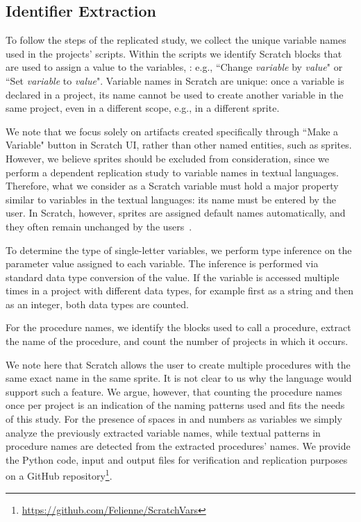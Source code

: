 \documentclass[conference]{IEEEtran}
\begin{document}
\subsection{Identifier Extraction}
To follow the steps of the replicated study, we collect the unique variable names used in the projects' scripts. 
Within the scripts we identify Scratch blocks that are used to assign a value to the variables, : e.g., ``Change \textit{variable} by \textit{value}" or ``Set \textit{variable} to \textit{value}". 
Variable names in Scratch are unique: once a variable is declared in a project, its name cannot be used to create another variable in the same project, even in a different scope, e.g., in a different sprite.  

We note that we focus solely on artifacts created specifically through ``Make a Variable" button in Scratch UI, rather than other named entities, such as sprites. However, we believe sprites should be excluded from consideration, since we perform a dependent replication study to variable names in textual languages. Therefore, what we consider as a Scratch variable must hold a major property similar to variables in the textual languages: its name must be entered by the user. In Scratch, however, sprites are assigned default names automatically, and they often remain unchanged by the users~\cite{MoreonoRobles}.

To determine the type of single-letter variables, we perform type inference on the parameter value assigned to each variable. 
The inference is performed via standard data type conversion of the value.
If the variable is accessed multiple times in a project with different data types, for example first as a string and then as an integer, both data types are counted.

For the procedure names, we identify the blocks used to call a procedure, extract the name of the procedure, and count the number of projects in which it occurs. 

We note here that Scratch allows the user to create multiple procedures with the same exact name in the same sprite. It is not clear to us why the language would support such a feature. We argue, however, that counting the procedure names once per project is an indication of the naming patterns used and fits the needs of this study. For the presence of spaces in and numbers as variables we simply analyze the previously extracted variable names, while textual patterns in procedure names are detected from the extracted procedures' names.
We provide the Python code, input and output files for verification and replication purposes on a GitHub repository\footnote{\url{https://github.com/Felienne/ScratchVars}}.
\end{document}
